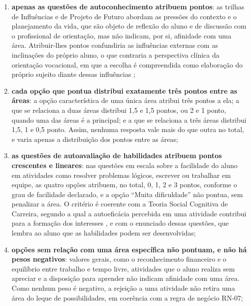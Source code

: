 \begin{enumerate}
  \item \textbf{apenas as questões de autoconhecimento atribuem pontos}: as trilhas de Influências e de Projeto de Futuro abordam as pressões do contexto e o planejamento da vida, que são objeto de reflexão do aluno e de discussão com o profissional de orientação, mas não indicam, por si, afinidade com uma área. Atribuir-lhes pontos confundiria as influências externas com as inclinações do próprio aluno, o que contraria a perspectiva clínica da orientação vocacional, em que a escolha é compreendida como elaboração do próprio sujeito diante dessas influências \cite{bohoslavsky2015};
  \item \textbf{cada opção que pontua distribui exatamente três pontos entre as áreas}: a opção característica de uma única área atribui três pontos a ela; a que se relaciona a duas áreas distribui 1,5 e 1,5 pontos, ou 2 e 1 ponto, quando uma das áreas é a principal; e a que se relaciona a três áreas distribui 1,5, 1 e 0,5 ponto. Assim, nenhuma resposta vale mais do que outra no total, e varia apenas a distribuição dos pontos entre as áreas;
  \item \textbf{as questões de autoavaliação de habilidades atribuem pontos crescentes e lineares}: nas questões em escala sobre a facilidade do aluno em atividades como resolver problemas lógicos, escrever ou trabalhar em equipe, as quatro opções atribuem, no total, 0, 1, 2 e 3 pontos, conforme o grau de facilidade declarado, e a opção ``Muita dificuldade'' não pontua, sem penalizar a área. O critério é coerente com a Teoria Social Cognitiva de Carreira, segundo a qual a autoeficácia percebida em uma atividade contribui para a formação dos interesses \cite{lent1994}, e com o enunciado dessas questões, que lembra ao aluno que as habilidades podem ser desenvolvidas;
  \item \textbf{opções sem relação com uma área específica não pontuam, e não há pesos negativos}: valores gerais, como o reconhecimento financeiro e o equilíbrio entre trabalho e tempo livre, atividades que o aluno realiza sem apreciar e a disposição para aprender não indicam afinidade com uma área. Como nenhum peso é negativo, a rejeição a uma atividade não retira uma área do leque de possibilidades, em coerência com a regra de negócio RN-07;

\end{enumerate}
